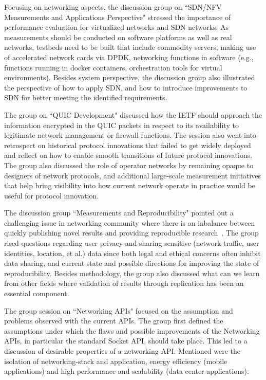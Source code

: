 
Focusing on networking aspects, the discussion group
on ``SDN/NFV Measurements and Applications Perspective"
stressed the importance of performance evaluation for virtualized networks and
SDN networks. As measurements should be conducted on software platforms as well
as real networks, testbeds need to be built that include
commodity servers, making use of accelerated network cards via
\ac{DPDK}, networking functions in software (e.g., functions running in docker
containers, orchestration tools for virtual environments).
Besides system perspective, the discussion group also illustrated the perspective
of how to apply SDN, and how to introduce improvements to SDN 
for better meeting the identified requirements. 


The group on ``QUIC Development" discussed how
the \ac{IETF} should approach the information encrypted in the QUIC
packets in respect to its availability to legitimate network management or firewall
functions. The session also went into retrospect on historical protocol
innovations that failed to get widely deployed and reflect on how to enable
smooth transitions of future protocol innovations. The group also
discussed the role of operator networks by remaining opaque to
designers of network protocols, and additional large-scale
measurement initiatives that help bring visibility into how current network
operate in practice would be useful for protocol innovation.


The discussion group ``Measurements and Reproducibility" pointed out 
a challenging issue in networking community where there is an inbalance between
quickly publishing novel results and providing reproducible
research~\cite{vbajpai:reproducibility:2017, qscheitle:reproducibility:2017}.
The group rised questions regarding user privacy and sharing
sensitive (network traffic, user identities, location, et al.) data since both
legal and ethical concerns often inhibit data sharing, and current state and
possible directions for improving the state of reproducibility.
Besides methodology, the group also discussed what can we learn from other fields
where validation of results through replication has been an essential component.


The group session on ``Networking APIs" focused on the assumption and problems
observed with the current APIs. The group first defined the assumptions
under which the flaws and possible improvements of the Networking APIs, in
particular the standard Socket API, should take place.
This led to a discussion of desirable properties of a networking API.
Mentioned were the isolation of networking-stack and application, energy
efficiency (mobile applications) and high performance and scalability (data
center applications).

